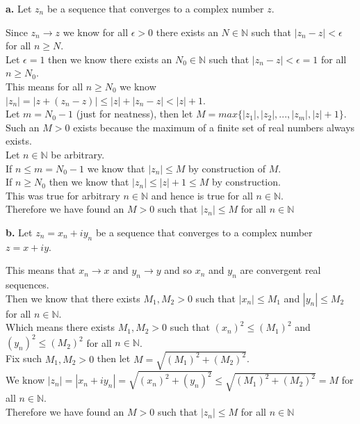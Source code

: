 \documentclass{article}
\begin{document}
{\Large\textbf{a.}} Let $z_n$ be a sequence that converges to a complex number $z$.
\begin{center}
    \doublespacing
    Since $z_n\rightarrow z$ we know for all $\epsilon > 0$ there exists an $N\in\mathbb{N}$ such that $|z_n - z| <\epsilon$ for all $n\geq N$.
    \\Let $\epsilon = 1$ then we know there exists an $N_0\in\mathbb{N}$ such that $|z_n - z| <\epsilon = 1$ for all $n\geq N_0$.
    \\This means for all $n\geq N_0$ we know $|z_n| = |z + (z_n - z)|\leq |z| + |z_n - z| < |z| + 1$.
    \\Let $m = N_0 - 1$ (just for neatness), then let $M = max\{|z_1|, |z_2|, ..., |z_m|, |z| + 1\}$.
    \\Such an $M > 0$ exists because the maximum of a finite set of real numbers always exists.
    \\Let $n\in\mathbb{N}$ be arbitrary.
    \\If $n\leq m = N_0 - 1$ we know that $|z_n|\leq M$ by construction of $M$.
    \\If $n\geq N_0$ then we know that $|z_n|\leq |z| + 1\leq M$ by construction.
    \\This was true for arbitrary $n\in\mathbb{N}$ and hence is true for all $n\in\mathbb{N}$.
    \\Therefore we have found an $M > 0$ such that $|z_n|\leq M$ for all $n\in\mathbb{N}$ \qedsymbol
\end{center}

{\Large\textbf{b.}} Let $z_n = x_n + iy_n$ be a sequence that converges to a complex number $z = x + iy$.
\begin{center}
    \doublespacing
    This means that $x_n\rightarrow x$ and $y_n\rightarrow y$ and so $x_n$ and $y_n$ are convergent real sequences.
    \\Then we know that there exists $M_1, M_2 > 0$ such that $|x_n|\leq M_1$ and $|y_n|\leq M_2$ for all $n\in\mathbb{N}$.
    \\Which means there exists $M_1, M_2 > 0$ such that $(x_n)^2\leq (M_1)^2$ and $(y_n)^2\leq (M_2)^2$ for all $n\in\mathbb{N}$.
    \\Fix such $M_1, M_2 > 0$ then let $M =\sqrt{(M_1)^2 + (M_2)^2}$.
    \\We know $|z_n| = |x_n + iy_n| =\sqrt{(x_n)^2 + (y_n)^2}\leq\sqrt{(M_1)^2 + (M_2)^2} = M$ for all $n\in\mathbb{N}$.
    \\Therefore we have found an $M > 0$ such that $|z_n|\leq M$ for all $n\in\mathbb{N}$ \qedsymbol
\end{center}
\end{document}
